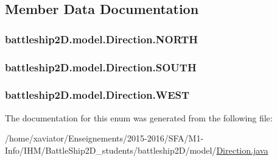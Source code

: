 \subsection{Member Data Documentation}
\hypertarget{enumbattleship2D_1_1model_1_1Direction_aedb04206b9e30ae29b3890ff2fc8449f}{
\subsubsection[{N\-O\-R\-T\-H}]{\setlength{\rightskip}{0pt plus 5cm}battleship2\-D.\-model.\-Direction.\-N\-O\-R\-T\-H}}\label{enumbattleship2D_1_1model_1_1Direction_aedb04206b9e30ae29b3890ff2fc8449f}
\hypertarget{enumbattleship2D_1_1model_1_1Direction_ae3b60a67e1c1c9005c6abee5ef5dde95}{
\subsubsection[{S\-O\-U\-T\-H}]{\setlength{\rightskip}{0pt plus 5cm}battleship2\-D.\-model.\-Direction.\-S\-O\-U\-T\-H}}\label{enumbattleship2D_1_1model_1_1Direction_ae3b60a67e1c1c9005c6abee5ef5dde95}
\hypertarget{enumbattleship2D_1_1model_1_1Direction_a2265bde02350197fca66c08e88c5db8a}{
\subsubsection[{W\-E\-S\-T}]{\setlength{\rightskip}{0pt plus 5cm}battleship2\-D.\-model.\-Direction.\-W\-E\-S\-T}}\label{enumbattleship2D_1_1model_1_1Direction_a2265bde02350197fca66c08e88c5db8a}


The documentation for this enum was generated from the following file\-:\begin{DoxyCompactItemize}
\item 
/home/xaviator/\-Enseignements/2015-\/2016/\-S\-F\-A/\-M1-\/\-Info/\-I\-H\-M/\-Battle\-Ship2\-D\-\_\-students/battleship2\-D/model/\hyperlink{Direction_8java}{Direction.\-java}\end{DoxyCompactItemize}
